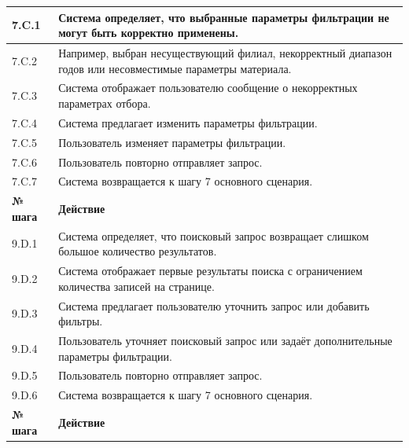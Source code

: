 \documentclass[12pt,a4paper]{article}
\begin{document}
\begin{xltabular}{\textwidth}{
			|>{\raggedright\arraybackslash}p{2.7cm}
			|>{\raggedright\arraybackslash}X|
		}
		7.C.1 & Система определяет, что выбранные параметры фильтрации не могут
		быть корректно применены. \\
		\hline
		7.C.2 & Например, выбран несуществующий филиал, некорректный диапазон
		годов или несовместимые параметры материала. \\
		\hline
		7.C.3 & Система отображает пользователю сообщение о некорректных
		параметрах отбора. \\
		\hline
		7.C.4 & Система предлагает изменить параметры фильтрации. \\
		\hline
		7.C.5 & Пользователь изменяет параметры фильтрации. \\
		\hline
		7.C.6 & Пользователь повторно отправляет запрос. \\
		\hline
		7.C.7 & Система возвращается к шагу 7 основного сценария. \\
		\hline
		
		
		\textbf{№ шага} & \textbf{Действие} \\
		\hline
		
		9.D.1 & Система определяет, что поисковый запрос возвращает слишком
		большое количество результатов. \\
		\hline
		9.D.2 & Система отображает первые результаты поиска с ограничением
		количества записей на странице. \\
		\hline
		9.D.3 & Система предлагает пользователю уточнить запрос или добавить
		фильтры. \\
		\hline
		9.D.4 & Пользователь уточняет поисковый запрос или задаёт дополнительные
		параметры фильтрации. \\
		\hline
		9.D.5 & Пользователь повторно отправляет запрос. \\
		\hline
		9.D.6 & Система возвращается к шагу 7 основного сценария. \\
		\hline
		
		
		\textbf{№ шага} & \textbf{Действие} \\
		\hline
		

\end{xltabular}
\end{document}
